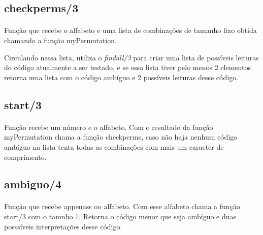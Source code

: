\documentclass[11pt]{article}
\begin{document}
	\subsection{checkperms/3}
	\paragraph{}
	Função que recebe o alfabeto e uma lista de combinações de tamanho fixo obtida chamando a função myPermutation.
	
	Circulando nessa lista, utiliza o \textit{findall/3} para criar uma lista de possíveis leituras do código atualmente a ser testado, e se essa lista tiver pelo menos 2 elementos retorna uma lista com o código ambíguo e 2 possíveis leituras desse código.

	\subsection{start/3}
	\paragraph{}
	Função recebe um número e o alfabeto.
	Com o resultado da função myPermutation chama a função checkperms, caso não haja nenhum código ambíguo na lista tenta todas as combinações com mais um caracter de comprimento.

	\subsection{ambiguo/4}
	\paragraph{}
	Função que recebe appenass oo alfabeto. Com esse alfabeto chama a função start/3 com o tamnho 1.
	Retorna o código menor que seja ambíguo e duas posssíveis interpretações desse código.
	
\end{document}
